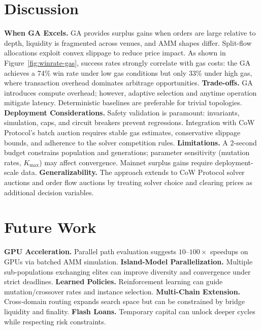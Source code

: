 \documentclass[11pt]{article}
\newcommand{\1}{\mathbf{1}}  %
\begin{document}
\section{Discussion}
\label{sec:discussion}
\textbf{When GA Excels.} GA provides surplus gains when orders are large relative to depth, liquidity is fragmented across venues, and AMM shapes differ. Split-flow allocations exploit convex slippage to reduce price impact. As shown in Figure~\ref{fig:winrate-gas}, success rates strongly correlate with gas costs: the GA achieves a 74\% win rate under low gas conditions but only 33\% under high gas, where transaction overhead dominates arbitrage opportunities.\newline
\textbf{Trade-offs.} GA introduces compute overhead; however, adaptive selection and anytime operation mitigate latency. Deterministic baselines are preferable for trivial topologies.\newline
\textbf{Deployment Considerations.} Safety validation is paramount: invariants, simulation, caps, and circuit breakers prevent regressions. Integration with CoW Protocol's batch auction requires stable gas estimates, conservative slippage bounds, and adherence to the solver competition rules.\newline
\textbf{Limitations.} A 2-second budget constrains population and generations; parameter sensitivity (mutation rates, $K_{\max}$) may affect convergence. Mainnet surplus gains require deployment-scale data.\newline
\textbf{Generalizability.} The approach extends to CoW Protocol solver auctions and order flow auctions by treating solver choice and clearing prices as additional decision variables.

\section{Future Work}
\label{sec:future}
\textbf{GPU Acceleration.} Parallel path evaluation suggests $10$--$100\times$ speedups on GPUs via batched AMM simulation.\newline
\textbf{Island-Model Parallelization.} Multiple sub-populations exchanging elites can improve diversity and convergence under strict deadlines.\newline
\textbf{Learned Policies.} Reinforcement learning can guide mutation/crossover rates and instance selection.\newline
\textbf{Multi-Chain Extension.} Cross-domain routing expands search space but can be constrained by bridge liquidity and finality.\newline
\textbf{Flash Loans.} Temporary capital can unlock deeper cycles while respecting risk constraints.
\end{document}

